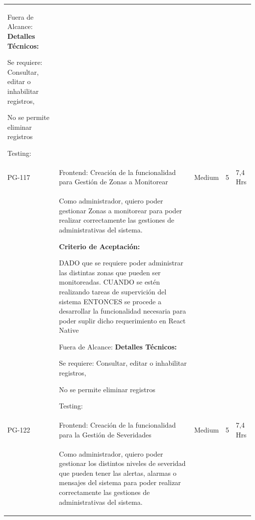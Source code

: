 \documentclass[11pt]{charter}
\begin{document}
\begin{landscape}
\begin{tabularx}{\linewidth}{@{}|p{1.3cm}|p{17cm}|p{1.7cm}|p{1.5cm}|p{1.7cm}|@{}}
\begin{description}
                   \item Fuera de Alcance:                 
                   \textbf{Detalles Técnicos:} 
                         \item Se requiere: Consultar, editar o inhabilitar registros, 
                         \item No se permite eliminar registros                 
                   \item Testing:
            \end{description} &  &     & \\
PG-117   & Frontend: Creación de la   funcionalidad para Gestión de Zonas a Monitorear          & Medium             & 5   & 7,4  Hrs          \\
         &  \begin{description}                 
                   \item Como administrador, quiero poder   gestionar Zonas a monitorear para poder realizar correctamente las gestiones   de administrativas del sistema.                 
                   \item \textbf{Criterio de Aceptación:}                 
                   \item DADO que se requiere poder administrar las distintas zonas que pueden ser   monitoreadas. CUANDO se estén realizando tareas de supervición del sistema ENTONCES se procede a desarrollar la funcionalidad necesaria para poder   suplir dicho requerimiento en React Native             
                   \item Fuera de Alcance:                 
                   \textbf{Detalles Técnicos:} 
                         \item Se requiere: Consultar, editar o inhabilitar registros, 
                         \item No se permite eliminar registros                 
                   \item Testing:
            \end{description}   &  &     & \\
PG-122   & Frontend: Creación de la   funcionalidad para la Gestión de Severidades              & Medium             & 5   & 7,4  Hrs          \\
         &  \begin{description}                 
                   \item Como administrador, quiero poder   gestionar los distintos niveles de severidad que pueden tener las alertas,   alarmas o mensajes del sistema para poder realizar correctamente las   gestiones de administrativas del sistema.                 

\end{description}
\end{tabularx}
\end{landscape}
\end{document}
